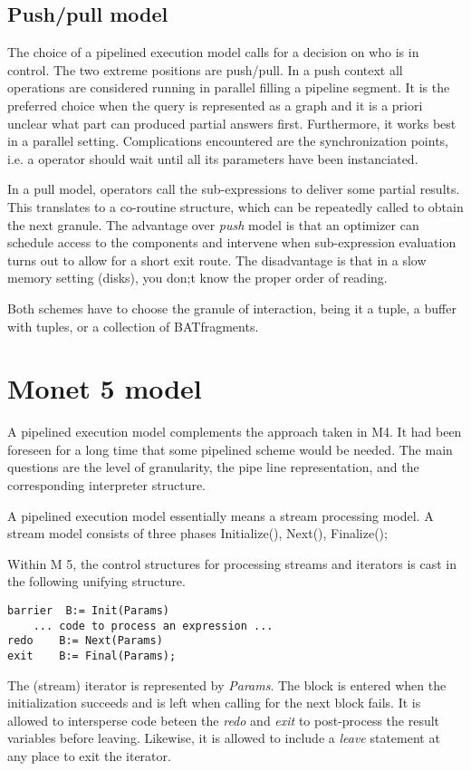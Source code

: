 \documentclass[10pt,twocolumn,fleqn]{article}
\begin{document}
\subsection{Push/pull model}
The choice of a pipelined execution model calls for a decision on who is in
control. The two extreme positions are push/pull. In a push context all
operations are considered running in parallel filling a pipeline segment.
It is the preferred choice when the query is represented as a graph and it is
a priori unclear what part can produced partial answers first. Furthermore, 
it works best in a parallel setting. Complications encountered are the
synchronization points, i.e. a operator should wait until all its parameters
have been instanciated.

In a pull model, operators call the sub-expressions to deliver some partial
results. This translates to a co-routine structure, which can be 
repeatedly called to obtain the next granule.
The advantage over {\em push} model is that an optimizer can schedule 
access to the components and intervene when sub-expression evaluation turns
out to allow for a short exit route. The disadvantage is that in a slow 
memory setting (disks), you don;t know the proper order of reading.

Both schemes have to choose the granule of interaction, being it a tuple,
a buffer with tuples, or a collection of BATfragments.

\section{Monet 5 model}
A pipelined execution model complements the approach taken in M4.
It had been foreseen for a long time that some pipelined scheme would be needed.
The main questions are the level of granularity,
the pipe line representation, and the corresponding interpreter structure.

A pipelined execution model essentially means a stream processing model.
A stream model consists of three phases Initialize(), Next(), Finalize();

Within M 5, the control structures for processing streams and iterators is
cast in the following unifying structure.
\begin{verbatim}
barrier  B:= Init(Params)
	... code to process an expression ...
redo	B:= Next(Params)
exit	B:= Final(Params);
\end{verbatim}

The (stream) iterator is represented by {\em Params}. The block is 
entered when the
initialization succeeds and is left when calling for the next block fails.
It is allowed to intersperse code beteen the {\em redo} and {\em exit} 
to post-process the result variables before leaving.
Likewise, it is allowed to include a {\em leave} statement at any place to
exit the iterator.
\end{document}
